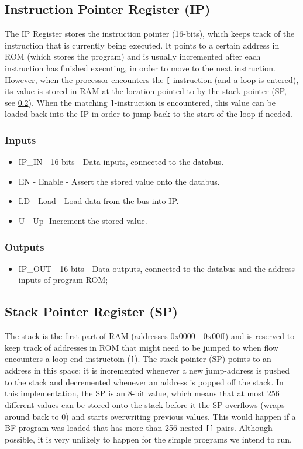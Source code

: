\subsection{Instruction Pointer Register (IP)} \label{sec:architecture:ip}
The IP Register stores the instruction pointer (16-bits), which keeps track of the instruction that is currently being executed. It points to a certain address in ROM (which stores the program) and is usually incremented after each instruction has finished executing, in order to move to the next instruction. However, when the processor encounters the \texttt{[}-instruction (and a loop is entered), its value is stored in RAM at the location pointed to by the stack pointer (SP, see \ref{sec:architecture:sp}). When the matching \texttt{]}-instruction is encountered, this value can be loaded back into the IP in order to jump back to the start of the loop if needed.

\subsubsection*{Inputs}
\begin{itemize}
\itemsep0em 
\item IP\_IN - 16 bits - Data inputs, connected to the databus.
\item EN - Enable - Assert the stored value onto the databus.
\item LD - Load - Load data from the bus into IP.
\item U - Up -Increment the stored value. 
\end{itemize}

\subsubsection*{Outputs}
\begin{itemize}
\itemsep0em 
\item IP\_OUT - 16 bits - Data outputs, connected to the databus and the address inputs of program-ROM;
\end{itemize}


\subsection{Stack Pointer Register (SP)} \label{sec:architecture:sp}
The stack is the first part of RAM (addresses 0x0000 - 0x00ff) and is reserved to keep track of addresses in ROM that might need to be jumped to when flow encounters a loop-end instructoin (\texttt{]}). The stack-pointer (SP) points to an address in this space; it is incremented whenever a new jump-address is pushed to the stack and decremented whenever an address is popped off the stack. In this implementation, the SP is an 8-bit value, which means that at most 256 different values can be stored onto the stack before it the SP overflows (wraps around back to 0) and starts overwriting previous values. This would happen if a BF program was loaded that has more than 256 nested \texttt{[]}-pairs. Although possible, it is very unlikely to happen for the simple programs we intend to run.

